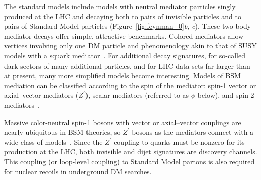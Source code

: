 \documentclass{ar-1col}
\newcommand{\IP}{invisible particle}
\newcommand{\Zprime}{\ensuremath{{Z}^\prime}\xspace}
\begin{document}
{The standard models include models with neutral mediator particles
singly produced at the LHC and decaying both to pairs of {\IP}s and to
pairs of Standard Model particles (Figure~\ref{fig:feynman_0}{\em b},{\em
c}). These two-body mediator decays offer simple, attractive benchmarks.
Colored mediators allow vertices involving only one DM particle
and phenomenology akin to that of SUSY models with a squark
mediator~\cite{Papucci:2014iwa,An:2013xka,Bell:2012rg}.
For additional decay signatures, for so-called dark sectors of many
additional particles, and for LHC data sets far larger than at
present, many more simplified models become interesting.
Models of BSM mediation can be classified according to the spin of
the mediator: spin-1 vector or axial--vector mediators (\Zprime),
scalar mediators (referred to as $\phi$ below), and spin-2
mediators~\cite{Han:2015cty}.


{Massive color-neutral spin-1 bosons with vector or
axial--vector couplings} are nearly ubiquitous in BSM theories, so
\Zprime bosons as the mediators connect with a wide class of
models~\cite{Shoemaker:2011vi}. Since the \Zprime coupling to
quarks must be nonzero for its production at the LHC, both
invisible and dijet signatures are discovery channels. This
coupling (or loop-level coupling) to Standard Model partons is also required
for nuclear recoils in underground DM searches.

}
\end{document}
